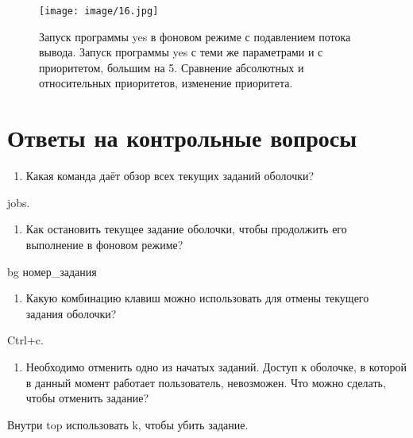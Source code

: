 \documentclass[
  english,
  russian,
  12pt,
  a4paper,
  DIV=11,
  numbers=noendperiod]{scrreprt}
\providecommand{\tightlist}{%
  \setlength{\itemsep}{0pt}\setlength{\parskip}{0pt}}
\begin{document}
\begin{figure}

{\centering \texttt{[image: image/16.jpg]}

}

\caption{Запуск программы yes в фоновом режиме с подавлением потока
вывода. Запуск программы yes с теми же параметрами и с приоритетом,
большим на 5. Сравнение абсолютных и относительных приоритетов,
изменение приоритета.}

\end{figure}%

\chapter{Ответы на контрольные
вопросы}\label{ux43eux442ux432ux435ux442ux44b-ux43dux430-ux43aux43eux43dux442ux440ux43eux43bux44cux43dux44bux435-ux432ux43eux43fux440ux43eux441ux44b}

\begin{enumerate}
\def\labelenumi{\arabic{enumi}.}
\tightlist
\item
  Какая команда даёт обзор всех текущих заданий оболочки?
\end{enumerate}

jobs.

\begin{enumerate}
\def\labelenumi{\arabic{enumi}.}
\setcounter{enumi}{1}
\tightlist
\item
  Как остановить текущее задание оболочки, чтобы продолжить его
  выполнение в фоновом режиме?
\end{enumerate}

bg номер\_задания

\begin{enumerate}
\def\labelenumi{\arabic{enumi}.}
\setcounter{enumi}{2}
\tightlist
\item
  Какую комбинацию клавиш можно использовать для отмены текущего задания
  оболочки?
\end{enumerate}

Ctrl+c.

\begin{enumerate}
\def\labelenumi{\arabic{enumi}.}
\setcounter{enumi}{3}
\tightlist
\item
  Необходимо отменить одно из начатых заданий. Доступ к оболочке, в
  которой в данный момент работает пользователь, невозможен. Что можно
  сделать, чтобы отменить задание?
\end{enumerate}

Внутри top использовать k, чтобы убить задание.
\end{document}
